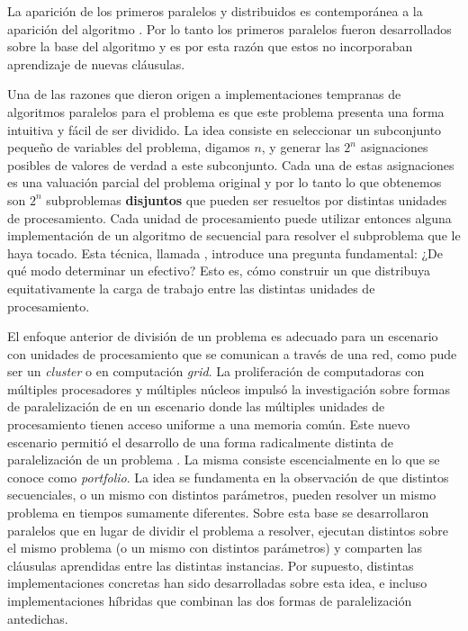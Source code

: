 La aparición de los primeros \ssolvers paralelos y distribuidos
\cite{bohm:1996:afast, zhang:jsc-1996} es contemporánea a la aparición del
algoritmo \CDCL. Por lo tanto los primeros \ssolvers paralelos fueron
desarrollados sobre la base del algoritmo \dpll y es por esta razón que estos \ssolvers
no incorporaban aprendizaje de nuevas cláusulas.

Una de las razones que dieron origen a implementaciones tempranas de
algoritmos paralelos para el problema \sat es que este problema presenta una
forma intuitiva y fácil de ser dividido. La idea consiste en seleccionar un
subconjunto pequeño de variables del problema, digamos $n$, y generar las $2^n$ asignaciones
posibles de valores de verdad a este subconjunto. Cada una de estas
asignaciones es una valuación parcial del problema original y por lo tanto lo
que obtenemos son $2^n$ subproblemas \textbf{disjuntos} que pueden ser
resueltos por distintas unidades de procesamiento. Cada unidad de procesamiento
puede utilizar entonces alguna implementación de un algoritmo de \ssolving
secuencial para resolver el subproblema que le haya tocado. Esta técnica,
llamada \gp, introduce una pregunta fundamental: ¿De qué modo determinar un
\gp efectivo? Esto es, cómo construir un \gp que distribuya equitativamente la
carga de trabajo entre las distintas unidades de procesamiento.

El enfoque anterior de división de un problema \sat es adecuado para un
escenario con unidades de procesamiento que se comunican a través de una red,
como pude ser un \emph{cluster} o en computación \emph{grid}. La proliferación
de computadoras con múltiples procesadores y múltiples núcleos impulsó la
investigación sobre formas de paralelización de \ssolvers en un escenario
donde las múltiples unidades de procesamiento tienen acceso uniforme a una
memoria común. Este nuevo escenario permitió el desarrollo de una forma
radicalmente distinta de paralelización de un problema \sat. La misma consiste
escencialmente en lo que se conoce como \emph{portfolio}. La idea se
fundamenta en la observación de que distintos \ssolvers secuenciales, o un
mismo \ssolver con distintos parámetros, pueden resolver un mismo problema en
tiempos sumamente diferentes. Sobre esta base se desarrollaron \ssolvers
paralelos que en lugar de dividir el problema a resolver, ejecutan distintos
\ssolvers sobre el mismo problema (o un mismo \ssolver con distintos
parámetros) y comparten las cláusulas aprendidas entre las distintas
instancias. Por supuesto, distintas implementaciones concretas han sido
desarrolladas sobre esta idea, e incluso implementaciones híbridas que
combinan las dos formas de paralelización antedichas.

